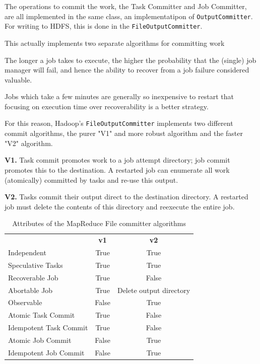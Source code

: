 \documentclass[9pt,technote]{IEEEtran}
\begin{document}
The operations to commit the work, the Task Committer and Job Committer,
are all implemented in the same class, an implementatipon of \texttt{OutputCommitter}.
For writing to HDFS, this is done in the \texttt{FileOutputCommitter}.

This actually implements two separate algorithms for committing work

The longer a job takes to execute, the higher the probability that the (single)
job manager will fail, and hence the ability to recover from a job failure
considered valuable.


Jobs which take a few minutes are generally so inexpensive to
restart that focusing on execution time over recoverability is a better strategy.

For this reason, Hadoop's \texttt{FileOutputCommitter} implements two
different commit algorithms, the purer "V1" and more robust algorithm and the
faster "V2" algorithm.



\textbf{V1.}
Task commit promotes work to a job attempt directory;
job commit promotes this to the destination.
A restarted job can enumerate all work (atomically)
committed by tasks and re-use this output.

\textbf{V2.}
Tasks commit their output direct to the destination directory.
A restarted job must delete the contents of this directory and reexecute
the entire job.

\begin{table}
  \label{tab:file-committer-attributes}
  \begin{tabular}{ l c c }
    \hline
    & \textbf{v1} & \textbf{v2} \\
    Independent & True & True \\
    Speculative Tasks & True & True \\
    Recoverable Job & True & False \\
    Abortable Job & True & Delete output directory \\
    Observable & False & True \\
    Atomic Task Commit & True & False \\
    Idempotent Task Commit & True & False \\
    Atomic Job Commit & False & True \\
    Idempotent Job Commit & False & True \\
    \hline
  \end{tabular}
  \caption{Attributes of the MapReduce File committer algorithms}
\end{table}
\end{document}
